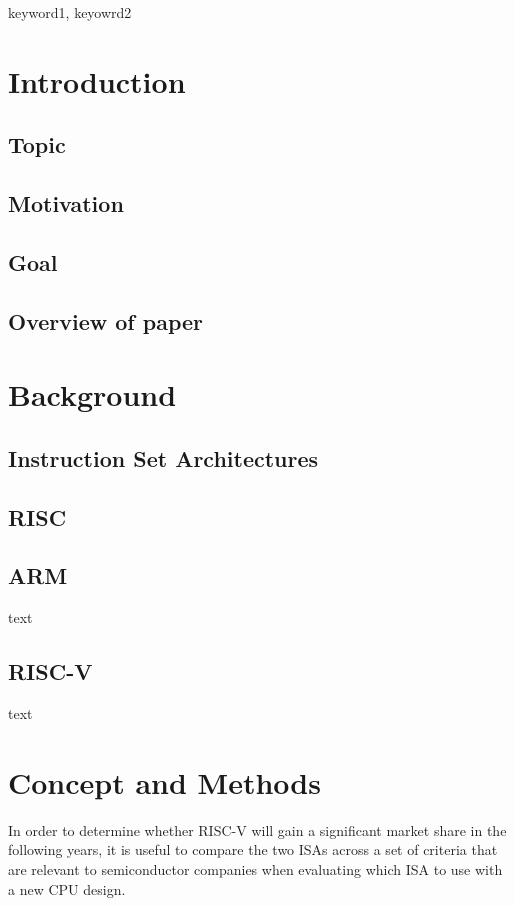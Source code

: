 \documentclass[conference]{IEEEtran}
\begin{document}
\begin{IEEEkeywords}
keyword1, keyowrd2
\end{IEEEkeywords}

\section{Introduction}
\label{ref:introduction}
	\subsection{Topic}
	\subsection{Motivation}
	\subsection{Goal}
	\subsection{Overview of paper}

\section{Background}
\label{ref:background}
	\subsection{Instruction Set Architectures}
	\subsection{RISC}
	\subsection{ARM}
	text
	\subsection{RISC-V}
	text

\section{Concept and Methods}
\label{ref:concept}
In order to determine whether RISC-V will gain a significant market share in the following years, it is useful to compare the two \glspl{ISA}
across a set of criteria that are relevant to semiconductor companies when evaluating which \gls{ISA} to use with a new CPU design.
\end{document}
